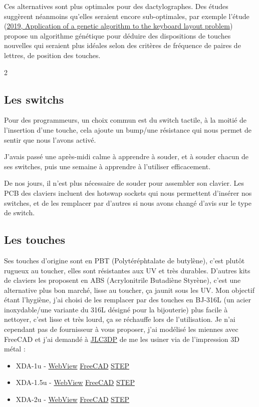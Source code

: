 \documentclass[a4paper,11pt]{article}
\newcommand{\includetri}[1]{
  #1 - \href{ressources/#1.html}{WebView}\textperiodcentered
  \href{ressources/#1.FCStd}{FreeCAD}\textperiodcentered
  \href{ressources/#1.stp}{STEP}
}
\begin{document}
\begin{blogmain}
Ces alternatives sont plus optimales pour des dactylographes.
Des études suggèrent néanmoins qu'elles seraient encore sub-optimales, par exemple l'étude (\href{https://pmc.ncbi.nlm.nih.gov/articles/PMC6946161/}{2019, Application of a genetic algorithm to the keyboard layout problem}) propose un algorithme génétique pour déduire des dispositions de touches nouvelles qui seraient plus idéales selon des critères de fréquence de paires de lettres, de position des touches. 

\newpage

\begin{multicols}{2}
\raggedcolumns

\subsection{Les switchs}
Pour des programmeurs, un choix commun est du switch tactile, à la moitié de l'insertion d'une touche, cela ajoute un bump/une résistance qui nous permet de sentir que nous l'avons activé.


J'avais passé une après-midi calme à apprendre à souder, et à souder chacun de ses switches, puis une semaine à apprendre à l'utiliser efficacement.

De nos jours, il n'est plus nécessaire de souder pour assembler son clavier.
Les PCB des claviers incluent des hotswap sockets qui nous permettent d'insérer nos switches, et de les remplacer par d'autres si nous avons changé d'avis sur le type de switch.


\columnbreak

\subsection{Les touches}
Ses touches d'origine sont en PBT (Polytéréphtalate de butylène), c'est plutôt rugueux au toucher, elles sont résistantes aux UV et très durables. D'autres kits de claviers les proposent en ABS (Acrylonitrile Butadiène Styrène), c'est une alternative plus bon marché, lisse au toucher, ça jaunit sous les UV.
Mon objectif étant l'hygiène, j'ai choisi de les remplacer par des touches en BJ-316L (un acier inoxydable/une variante du 316L désigné pour la bijouterie) plus facile à nettoyer, c'est lisse et très lourd, ça se réchauffe lors de l'utilisation.
Je n'ai cependant pas de fournisseur à vous proposer, j'ai modélisé les miennes avec FreeCAD et j'ai demandé à \href{https://jlc3dp.com}{JLC3DP} de me les usiner via de l'impression 3D métal :
\begin{itemize}
  \item \includetri{XDA-1u}
  \item \includetri{XDA-1.5u}
  \item \includetri{XDA-2u}
\end{itemize}


\end{multicols}
\end{blogmain}
\end{document}
